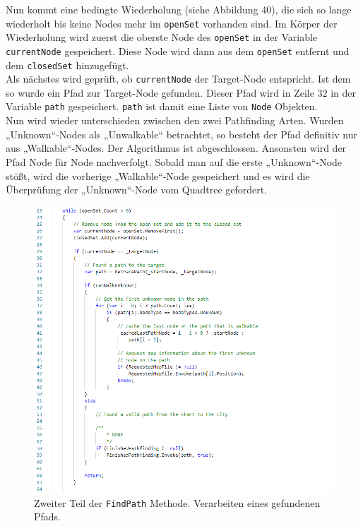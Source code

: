 \documentclass[a4paper,12pt]{article}
\newcommand{\code}{\texttt}
\begin{document}
Nun kommt eine bedingte Wiederholung (siehe Abbildung 40), die sich so lange wiederholt bis keine Nodes mehr im \code{openSet} vorhanden sind.
Im Körper der Wiederholung wird zuerst die oberste Node des \code{openSet} in der Variable \code{currentNode} gespeichert. Diese Node wird dann aus dem \code{openSet} entfernt und dem \code{closedSet} hinzugefügt.
\\[0.4cm]
Als nächstes wird geprüft, ob \code{currentNode} der Target-Node entspricht. Ist dem so wurde ein Pfad zur Target-Node gefunden. Dieser Pfad wird in Zeile 32 in der Variable \code{path} gespeichert. \code{path} ist damit eine Liste von \code{Node} Objekten.
\\[0.4cm]
Nun wird wieder unterschieden zwischen den zwei Pathfinding Arten. Wurden „Unknown“-Nodes als „Unwalkable“ betrachtet, so besteht der Pfad definitiv nur aus „Walkable“-Nodes. Der Algorithmus ist abgeschlossen. Ansonsten wird der Pfad Node für Node nachverfolgt. Sobald man auf die erste „Unknown“-Node stößt, wird die vorherige „Walkable“-Node gespeichert und es wird die Überprüfung der „Unknown“-Node vom Quadtree gefordert.
\begin{figure}[H]
    \centering
    \includegraphics[width=1\linewidth]{Bilder/Aufgabe3/Teilaufgabe_C/Pathfinding_02.png}
    \caption{Zweiter Teil der \code{FindPath} Methode. Verarbeiten eines gefundenen Pfads.}
\end{figure}
\end{document}
